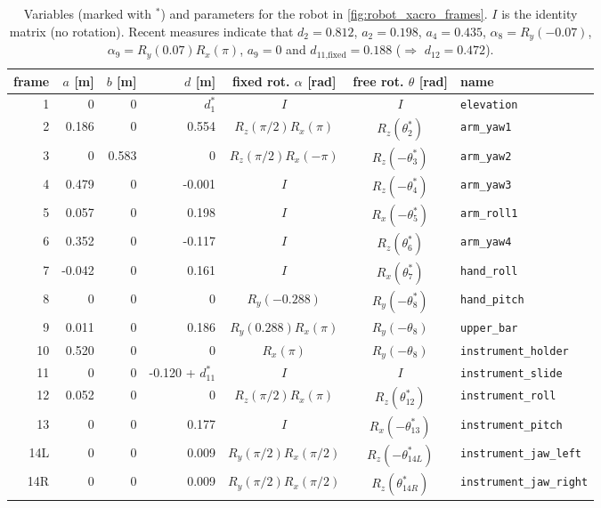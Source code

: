 \vspace{2mm}
\begin{table}[htbp]
\small
\centering
	\begin{tabular}{r | rrr c c l}\hline
		frame  & $a$ [m] & $b$ [m] & $d$ [m] & fixed rot. $\alpha$ [rad] & free rot. $\theta$ [rad] & name\\\hline
		1 & 0 & 0 & $d_1^*$ & $I$ & $I$ & \texttt{elevation}\\
		2 & 0.186 & 0 & 0.554 & $R_z(\pi/2)R_x(\pi)$ & $R_z(\theta_2^*)$ & \texttt{arm\_yaw1} \\
		3 & 0 & 0.583 & 0 & $R_z(\pi/2)R_x(-\pi)$ & $R_z(-\theta_3^*)$ & \texttt{arm\_yaw2} \\
		4 & 0.479 & 0 & -0.001 & $I$ & $R_z(-\theta_4^*)$ & \texttt{arm\_yaw3} \\
		5 & 0.057 & 0 & 0.198 & $I$ & $R_x(-\theta_5^*)$ & \texttt{arm\_roll1} \\
		6 & 0.352 & 0 & -0.117 & $I$ & $R_z(\theta_6^*)$ & \texttt{arm\_yaw4} \\
		7 & -0.042 & 0 & 0.161 & $I$ & $R_x(\theta_7^*)$ & \texttt{hand\_roll} \\
		8 & 0 & 0 & 0 & $R_y(-0.288)$ & $R_y(-\theta_8^*)$ & \texttt{hand\_pitch} \\
		9 & 0.011 & 0 & 0.186 & $R_y(0.288)R_x(\pi)$ & $R_y(-\theta_8)$ & \texttt{upper\_bar} \\
		10 & 0.520 & 0 & 0 & $R_x(\pi)$ & $R_y(-\theta_8)$ & \texttt{instrument\_holder} \\
		11 & 0 & 0 & -0.120 + $d_{11}^*$ & $I$ & $I$ & \texttt{instrument\_slide} \\
		12 & 0.052 & 0 & 0 & $R_z(\pi/2)R_x(\pi)$ & $R_z(\theta_{12}^*)$ & \texttt{instrument\_roll} \\
		13 & 0 & 0 & 0.177 & $I$ & $R_x(-\theta_{13}^*)$ & \texttt{instrument\_pitch} \\
		14L & 0 & 0 & 0.009 & $R_y(\pi/2)R_x(\pi/2)$ & $R_z(-\theta_{14L}^*)$ & \texttt{instrument\_jaw\_left} \\
		14R & 0 & 0 & 0.009 & $R_y(\pi/2)R_x(\pi/2)$ & $R_z(\theta_{14R}^*)$ & \texttt{instrument\_jaw\_right} \\
	\end{tabular}
	\caption{Variables (marked with $^*$) and parameters for the robot in \autoref{fig:robot_xacro_frames}. $I$ is the identity matrix (no rotation). Recent measures indicate that $d_2=0.812$, $a_2=0.198$, $a_4=0.435$, $\alpha_8=R_y(-0.07)$, $\alpha_9=R_y(0.07)R_x(\pi)$, $a_9=0$ and $d_\text{11,fixed}=0.188$ ($\Rightarrow$ $d_{12}=0.472$).}
	\label{tab:xacro_param}
\end{table}


